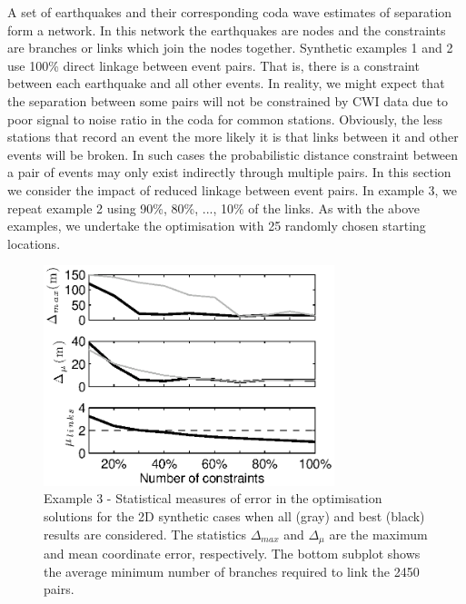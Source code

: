 \documentclass[extra]{gji}
\begin{document}
A set of earthquakes and their corresponding coda wave estimates of
separation form a network. In this network the earthquakes are nodes
and the constraints are branches or links which join the nodes
together. Synthetic examples 1 and 2 use 100\% direct linkage
between event pairs. That is, there is a constraint between each
earthquake and all other events. In reality, we might expect that
the separation between some pairs will not be constrained by CWI
data due to poor signal to noise ratio in the coda for common
stations. Obviously, the less stations that record an event the more
likely it is that links between it and other events will be broken.
In such cases the probabilistic distance constraint between a pair
of events may only exist indirectly through multiple pairs. In this
section we consider the impact of reduced linkage between event
pairs. In example 3, we repeat example 2 using 90\%, 80\%, ..., 10\%
of the links. As with the above examples, we undertake the
optimisation with 25 randomly chosen starting locations.

\begin{figure}
\noindent\includegraphics[width =
20pc]{diags/synth2Dmulti/ressummary_2Dsynth50eq.eps}
\caption{Example 3 - Statistical measures of error in the
optimisation solutions for the 2D synthetic cases when all (gray)
and best (black) results are considered. The statistics
$\Delta_{max}$ and $\Delta_\mu$  are the maximum and mean coordinate
error, respectively. The bottom subplot shows the average minimum
number of branches required to link the 2450 pairs.}
 \label{fig:optimisationresults-2Dsynth}
\end{figure}
\end{document}
